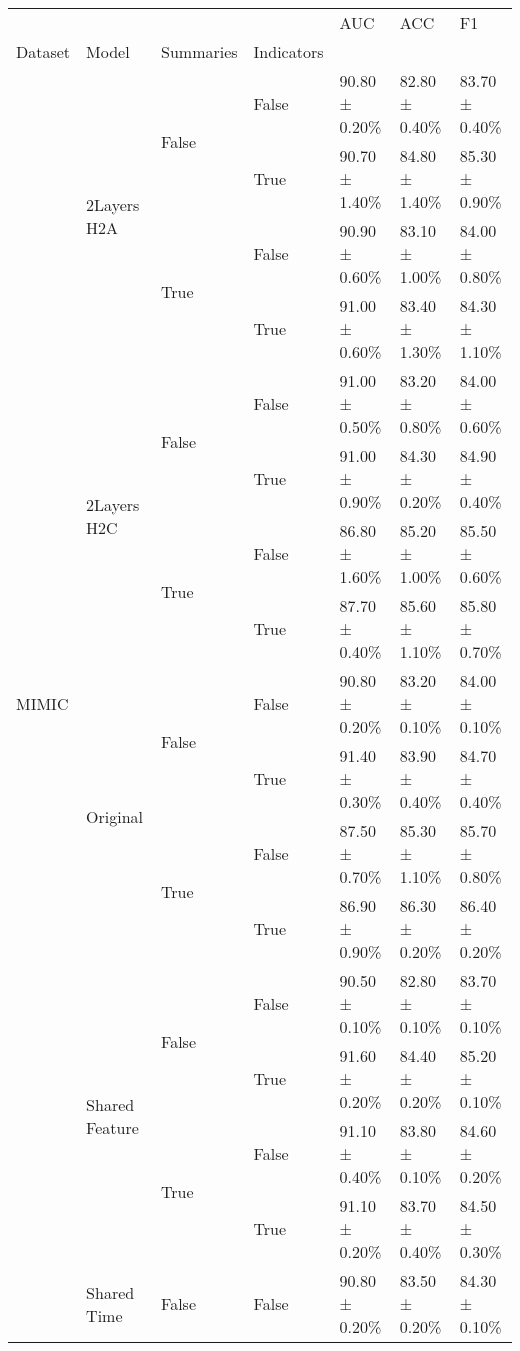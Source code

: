 \begin{tabular}{lllllll}
\toprule
 &  &  &  & AUC & ACC & F1 \\
Dataset & Model & Summaries & Indicators &  &  &  \\
\midrule
\multirow[t]{20}{*}{MIMIC} & \multirow[t]{4}{*}{2Layers H2A} & \multirow[t]{2}{*}{False} & False & 90.80 ± 0.20\% & 82.80 ± 0.40\% & 83.70 ± 0.40\% \\
 &  &  & True & 90.70 ± 1.40\% & 84.80 ± 1.40\% & 85.30 ± 0.90\% \\
\cline{3-7}
 &  & \multirow[t]{2}{*}{True} & False & 90.90 ± 0.60\% & 83.10 ± 1.00\% & 84.00 ± 0.80\% \\
 &  &  & True & 91.00 ± 0.60\% & 83.40 ± 1.30\% & 84.30 ± 1.10\% \\
\cline{2-7} \cline{3-7}
 & \multirow[t]{4}{*}{2Layers H2C} & \multirow[t]{2}{*}{False} & False & 91.00 ± 0.50\% & 83.20 ± 0.80\% & 84.00 ± 0.60\% \\
 &  &  & True & 91.00 ± 0.90\% & 84.30 ± 0.20\% & 84.90 ± 0.40\% \\
\cline{3-7}
 &  & \multirow[t]{2}{*}{True} & False & 86.80 ± 1.60\% & 85.20 ± 1.00\% & 85.50 ± 0.60\% \\
 &  &  & True & 87.70 ± 0.40\% & 85.60 ± 1.10\% & 85.80 ± 0.70\% \\
\cline{2-7} \cline{3-7}
 & \multirow[t]{4}{*}{Original} & \multirow[t]{2}{*}{False} & False & 90.80 ± 0.20\% & 83.20 ± 0.10\% & 84.00 ± 0.10\% \\
 &  &  & True & 91.40 ± 0.30\% & 83.90 ± 0.40\% & 84.70 ± 0.40\% \\
\cline{3-7}
 &  & \multirow[t]{2}{*}{True} & False & 87.50 ± 0.70\% & 85.30 ± 1.10\% & 85.70 ± 0.80\% \\
 &  &  & True & 86.90 ± 0.90\% & 86.30 ± 0.20\% & 86.40 ± 0.20\% \\
\cline{2-7} \cline{3-7}
 & \multirow[t]{4}{*}{Shared Feature} & \multirow[t]{2}{*}{False} & False & 90.50 ± 0.10\% & 82.80 ± 0.10\% & 83.70 ± 0.10\% \\
 &  &  & True & 91.60 ± 0.20\% & 84.40 ± 0.20\% & 85.20 ± 0.10\% \\
\cline{3-7}
 &  & \multirow[t]{2}{*}{True} & False & 91.10 ± 0.40\% & 83.80 ± 0.10\% & 84.60 ± 0.20\% \\
 &  &  & True & 91.10 ± 0.20\% & 83.70 ± 0.40\% & 84.50 ± 0.30\% \\
\cline{2-7} \cline{3-7}
 & \multirow[t]{4}{*}{Shared Time} & \multirow[t]{2}{*}{False} & False & 90.80 ± 0.20\% & 83.50 ± 0.20\% & 84.30 ± 0.10\% \\

\end{tabular}
